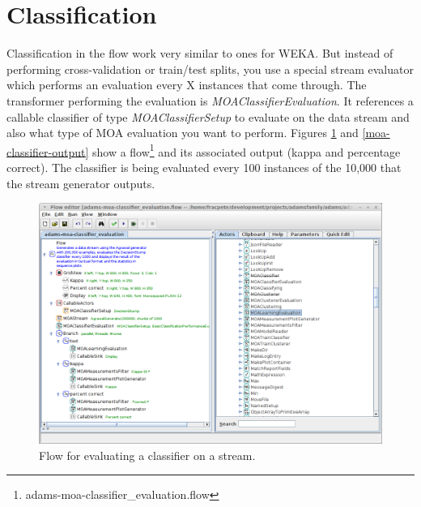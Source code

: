 \documentclass[a4paper]{book}
\begin{document}
\clearpage
\newpage
\section{Classification}
Classification in the flow work very similar to ones for WEKA.
But instead of performing cross-validation or train/test splits, you use a
special stream evaluator which performs an evaluation every X instances that
come through. The transformer performing the evaluation is 
\textit{MOAClassifierEvaluation}. It references a callable classifier of type 
\textit{MOAClassifierSetup} to evaluate on the data stream and also what type of MOA 
evaluation you want to perform.
Figures \ref{moa-classifier-flow} and \ref{moa-classifier-output} show a 
flow\footnote{adams-moa-classifier\_evaluation.flow} 
and its associated output (kappa and percentage correct). The classifier is 
being evaluated every 100 instances of the 10,000 that the stream generator 
outputs.

\begin{figure}[htb]
  \centering
  \includegraphics[width=12.0cm]{images/moa-classifier-flow.png}
  \caption{Flow for evaluating a classifier on a stream.}
  \label{moa-classifier-flow}
\end{figure}
\end{document}
